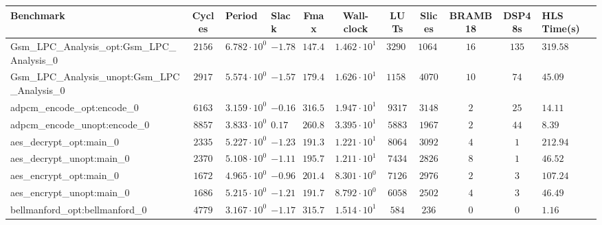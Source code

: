 \begin{tabular}{|l|c|HHc|c|c|c|c|cH|}
\hline
Benchmark                                       & Cycles       & Period                 & Slack     & Fmax       & Wall-clock              & LUTs       & Slices    & BRAMB18 & DSP48s  & HLS Time(s) \\
\hline
Gsm\_LPC\_Analysis\_opt:Gsm\_LPC\_Analysis\_0   & $ 2156     $ & $ 6.782 \cdot 10^{0} $ & $ -1.78 $ & $ 147.45 $ & $ 1.462 \cdot 10^{1}  $ & $ 32909  $ & $ 10649 $ & $ 16  $ & $ 135 $ & $ 319.58  $ \\
Gsm\_LPC\_Analysis\_unopt:Gsm\_LPC\_Analysis\_0 & $ 2917     $ & $ 5.574 \cdot 10^{0} $ & $ -1.57 $ & $ 179.40 $ & $ 1.626 \cdot 10^{1}  $ & $ 11587  $ & $ 4070  $ & $ 10  $ & $ 74  $ & $ 45.09   $ \\
adpcm\_encode\_opt:encode\_0                    & $ 6163     $ & $ 3.159 \cdot 10^{0} $ & $ -0.16 $ & $ 316.56 $ & $ 1.947 \cdot 10^{1}  $ & $ 9317   $ & $ 3148  $ & $ 2   $ & $ 25  $ & $ 14.11   $ \\
adpcm\_encode\_unopt:encode\_0                  & $ 8857     $ & $ 3.833 \cdot 10^{0} $ & $ 0.17  $ & $ 260.89 $ & $ 3.395 \cdot 10^{1}  $ & $ 5883   $ & $ 1967  $ & $ 2   $ & $ 44  $ & $ 8.39    $ \\
aes\_decrypt\_opt:main\_0                       & $ 2335     $ & $ 5.227 \cdot 10^{0} $ & $ -1.23 $ & $ 191.31 $ & $ 1.221 \cdot 10^{1}  $ & $ 8064   $ & $ 3092  $ & $ 4   $ & $ 1   $ & $ 212.94  $ \\
aes\_decrypt\_unopt:main\_0                     & $ 2370     $ & $ 5.108 \cdot 10^{0} $ & $ -1.11 $ & $ 195.77 $ & $ 1.211 \cdot 10^{1}  $ & $ 7434   $ & $ 2826  $ & $ 8   $ & $ 1   $ & $ 46.52   $ \\
aes\_encrypt\_opt:main\_0                       & $ 1672     $ & $ 4.965 \cdot 10^{0} $ & $ -0.96 $ & $ 201.41 $ & $ 8.301 \cdot 10^{0}  $ & $ 7126   $ & $ 2976  $ & $ 2   $ & $ 3   $ & $ 107.24  $ \\
aes\_encrypt\_unopt:main\_0                     & $ 1686     $ & $ 5.215 \cdot 10^{0} $ & $ -1.21 $ & $ 191.75 $ & $ 8.792 \cdot 10^{0}  $ & $ 6058   $ & $ 2502  $ & $ 4   $ & $ 3   $ & $ 46.49   $ \\
bellmanford\_opt:bellmanford\_0                 & $ 4779     $ & $ 3.167 \cdot 10^{0} $ & $ -1.17 $ & $ 315.76 $ & $ 1.514 \cdot 10^{1}  $ & $ 584    $ & $ 236   $ & $ 0   $ & $ 0   $ & $ 1.16    $ \\

\end{tabular}
